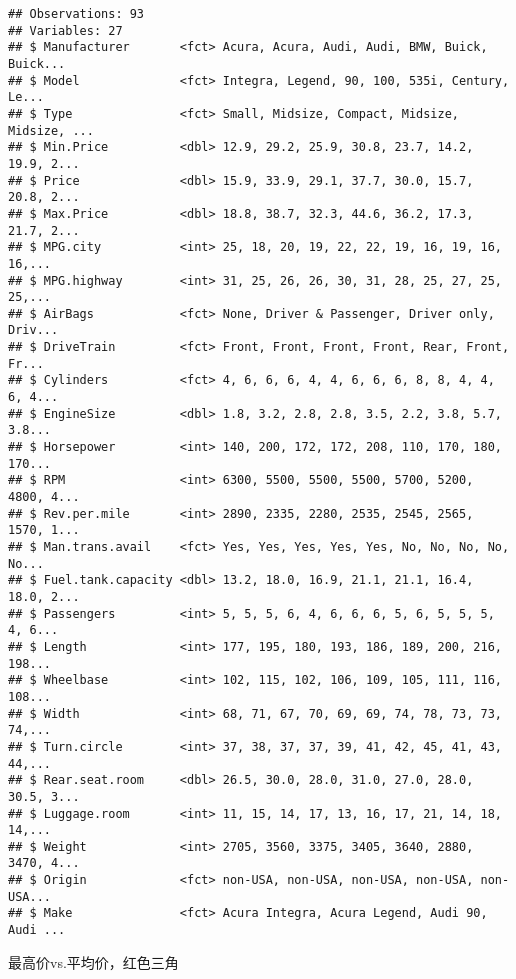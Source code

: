 \documentclass[]{book}
\newenvironment{Shaded}{\begin{snugshade}}{\end{snugshade}}
\newcommand{\DataTypeTok}[1]{\textcolor[rgb]{0.13,0.29,0.53}{#1}}
\newcommand{\DecValTok}[1]{\textcolor[rgb]{0.00,0.00,0.81}{#1}}
\newcommand{\KeywordTok}[1]{\textcolor[rgb]{0.13,0.29,0.53}{\textbf{#1}}}
\newcommand{\NormalTok}[1]{#1}
\newcommand{\OperatorTok}[1]{\textcolor[rgb]{0.81,0.36,0.00}{\textbf{#1}}}
\newcommand{\StringTok}[1]{\textcolor[rgb]{0.31,0.60,0.02}{#1}}
\begin{document}
\begin{verbatim}
## Observations: 93
## Variables: 27
## $ Manufacturer       <fct> Acura, Acura, Audi, Audi, BMW, Buick, Buick...
## $ Model              <fct> Integra, Legend, 90, 100, 535i, Century, Le...
## $ Type               <fct> Small, Midsize, Compact, Midsize, Midsize, ...
## $ Min.Price          <dbl> 12.9, 29.2, 25.9, 30.8, 23.7, 14.2, 19.9, 2...
## $ Price              <dbl> 15.9, 33.9, 29.1, 37.7, 30.0, 15.7, 20.8, 2...
## $ Max.Price          <dbl> 18.8, 38.7, 32.3, 44.6, 36.2, 17.3, 21.7, 2...
## $ MPG.city           <int> 25, 18, 20, 19, 22, 22, 19, 16, 19, 16, 16,...
## $ MPG.highway        <int> 31, 25, 26, 26, 30, 31, 28, 25, 27, 25, 25,...
## $ AirBags            <fct> None, Driver & Passenger, Driver only, Driv...
## $ DriveTrain         <fct> Front, Front, Front, Front, Rear, Front, Fr...
## $ Cylinders          <fct> 4, 6, 6, 6, 4, 4, 6, 6, 6, 8, 8, 4, 4, 6, 4...
## $ EngineSize         <dbl> 1.8, 3.2, 2.8, 2.8, 3.5, 2.2, 3.8, 5.7, 3.8...
## $ Horsepower         <int> 140, 200, 172, 172, 208, 110, 170, 180, 170...
## $ RPM                <int> 6300, 5500, 5500, 5500, 5700, 5200, 4800, 4...
## $ Rev.per.mile       <int> 2890, 2335, 2280, 2535, 2545, 2565, 1570, 1...
## $ Man.trans.avail    <fct> Yes, Yes, Yes, Yes, Yes, No, No, No, No, No...
## $ Fuel.tank.capacity <dbl> 13.2, 18.0, 16.9, 21.1, 21.1, 16.4, 18.0, 2...
## $ Passengers         <int> 5, 5, 5, 6, 4, 6, 6, 6, 5, 6, 5, 5, 5, 4, 6...
## $ Length             <int> 177, 195, 180, 193, 186, 189, 200, 216, 198...
## $ Wheelbase          <int> 102, 115, 102, 106, 109, 105, 111, 116, 108...
## $ Width              <int> 68, 71, 67, 70, 69, 69, 74, 78, 73, 73, 74,...
## $ Turn.circle        <int> 37, 38, 37, 37, 39, 41, 42, 45, 41, 43, 44,...
## $ Rear.seat.room     <dbl> 26.5, 30.0, 28.0, 31.0, 27.0, 28.0, 30.5, 3...
## $ Luggage.room       <int> 11, 15, 14, 17, 13, 16, 17, 21, 14, 18, 14,...
## $ Weight             <int> 2705, 3560, 3375, 3405, 3640, 2880, 3470, 4...
## $ Origin             <fct> non-USA, non-USA, non-USA, non-USA, non-USA...
## $ Make               <fct> Acura Integra, Acura Legend, Audi 90, Audi ...
\end{verbatim}

最高价vs.平均价，红色三角

\begin{Shaded}
\end{Shaded}
\end{document}
